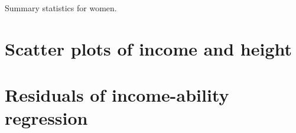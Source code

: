 \documentclass{article}
\begin{document}
\begin{table}[h]
\label{tab:summary_women}
\caption{Summary statistics for women.}

\end{table}

\clearpage

\section{Scatter plots of income and height}

\clearpage

\section{Residuals of income-ability regression}

\clearpage




\iffalse



\fi

\begin{appendix}
	\listoffigures
	\listoftables	
\end{appendix}
\end{document}
